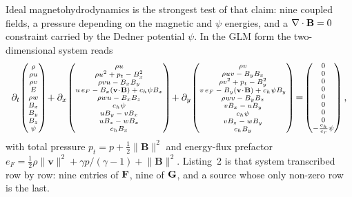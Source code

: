 \documentclass[10pt,onecolumn]{article}
\begin{document}
Ideal magnetohydrodynamics is the strongest test of that claim: nine coupled
fields, a pressure depending on the magnetic and $\psi$ energies, and a
$\nabla\cdot{\bf B}=0$ constraint carried by the Dedner potential $\psi$. In the
GLM form the two-dimensional system reads
\begin{equation}
\label{eq:mhd}
\scriptsize
\partial_t\!
\begin{pmatrix}\rho\\ \rho u\\ \rho v\\ E\\ \rho w\\ B_x\\ B_y\\ B_z\\ \psi\end{pmatrix}
\!+\partial_x\!
\begin{pmatrix}
\rho u\\
\rho u^2 + p_{t} - B_x^2\\
\rho v u - B_xB_y\\
u\,e_{F} - B_x(\mathbf{v}\!\cdot\!\mathbf{B}) + c_h\psi B_x\\
\rho w u - B_xB_z\\
c_h\psi\\
uB_y - vB_x\\
uB_z - wB_x\\
c_hB_x
\end{pmatrix}
\!+\partial_y\!
\begin{pmatrix}
\rho v\\
\rho u v - B_yB_x\\
\rho v^2 + p_{t} - B_y^2\\
v\,e_{F} - B_y(\mathbf{v}\!\cdot\!\mathbf{B}) + c_h\psi B_y\\
\rho w v - B_yB_z\\
vB_x - uB_y\\
c_h\psi\\
vB_z - wB_y\\
c_hB_y
\end{pmatrix}
\!=\!
\begin{pmatrix}0\\ 0\\ 0\\ 0\\ 0\\ 0\\ 0\\ 0\\ -\tfrac{c_h}{c_r}\psi\end{pmatrix},
\end{equation}
with total pressure $p_{t} = p + \tfrac12\lVert\mathbf{B}\rVert^2$ and
energy-flux prefactor
$e_{F} = \tfrac12\rho\lVert\mathbf{v}\rVert^2 + \gamma p/(\gamma-1) + \lVert\mathbf{B}\rVert^2$.
Listing~2 is that system transcribed row by row: nine entries of $\bf F$, nine of
$\bf G$, and a source whose only non-zero row is the last.
\end{document}
